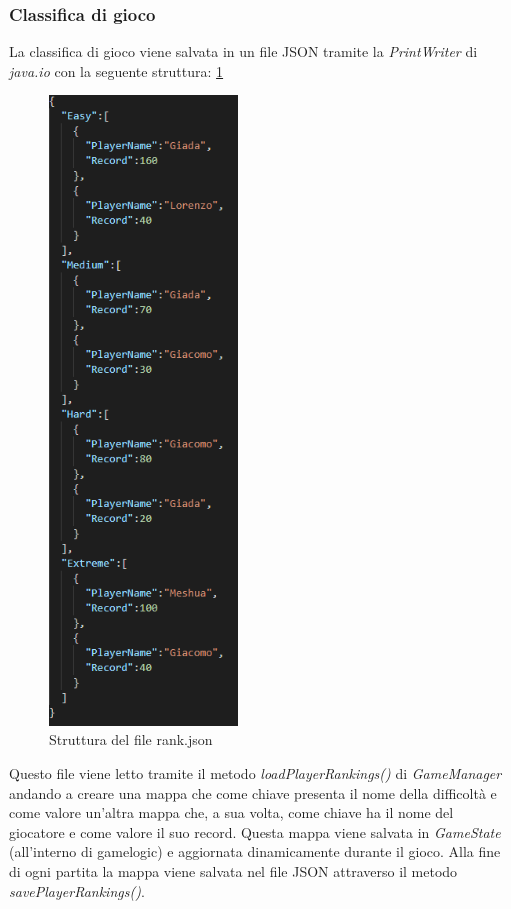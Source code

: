 \subsubsection{Classifica di gioco}
La classifica di gioco viene salvata in un file JSON tramite la \textit{PrintWriter} di \textit{java.io} con la seguente struttura: \ref{json}

\begin{figure}[H]
  \includegraphics[width=5cm]{../res/6-implementazione/chiana/json.png}
  \caption{Struttura del file rank.json}
  \label{json}
\end{figure}

Questo file viene letto tramite il metodo \textit{loadPlayerRankings()} di \textit{GameManager} andando a creare una mappa che come chiave presenta il nome della difficoltà e come valore un'altra mappa che, a sua volta, come chiave ha il nome del giocatore e come valore il suo record.
Questa mappa viene salvata in \textit{GameState} (all'interno di gamelogic) e aggiornata dinamicamente durante il gioco.
Alla fine di ogni partita la mappa viene salvata nel file JSON attraverso il metodo \textit{savePlayerRankings()}.

